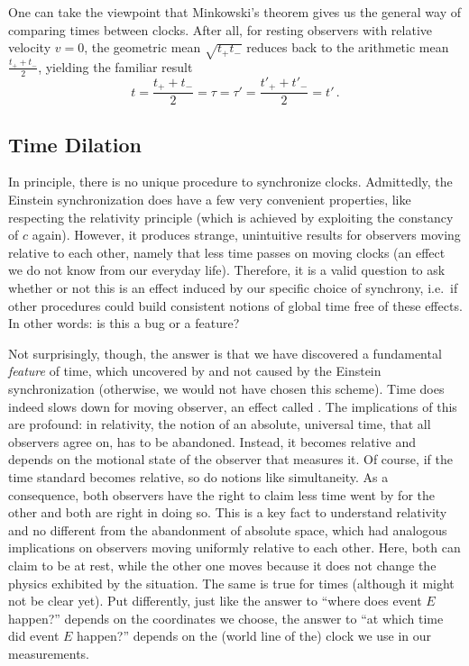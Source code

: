 


One can take the viewpoint that Minkowski's theorem gives us the general way of comparing times between clocks. After all, for resting observers with relative velocity $v = 0$, the geometric mean $\sqrt{t_+ t_-}$ reduces back to the arithmetic mean $\frac{t_+ + t_-}{2}$, yielding the familiar result
\begin{equation}
	t = \frac{t_+ + t_-}{2} = \tau = \tau' = \frac{t'_+ + t'_-}{2} = t' \, .
\end{equation}



		\subsection{Time Dilation}
In principle, there is no unique procedure to synchronize clocks. Admittedly, the Einstein synchronization does have a few very convenient properties, like respecting the relativity principle (which is achieved by exploiting the constancy of $c$ again). However, it produces strange, unintuitive results for observers moving relative to each other, namely that less time passes on moving clocks (an effect we do not know from our everyday life). Therefore, it is a valid question to ask whether or not this is an effect induced by our specific choice of synchrony, i.e.~if other procedures could build consistent notions of global time free of these effects. In other words: is this a bug or a feature?


Not surprisingly, though, the answer is that we have discovered a fundamental \emph{feature} of time, which uncovered by and not caused by the Einstein synchronization (otherwise, we would not have chosen this scheme). Time does indeed slows down for moving observer, an effect called . The implications of this are profound: in relativity, the notion of an absolute, universal time, that all observers agree on, has to be abandoned. Instead, it becomes relative and depends on the motional state of the observer that measures it. Of course, if the time standard becomes relative, so do notions like simultaneity. As a consequence, both observers have the right to claim less time went by for the other and both are right in doing so. This is a key fact to understand relativity and no different from the abandonment of absolute space, which had analogous implications on observers moving uniformly relative to each other. Here, both can claim to be at rest, while the other one moves because it does not change the physics exhibited by the situation. The same is true for times (although it might not be clear yet). Put differently, just like the answer to \enquote{where does event $E$ happen?} depends on the coordinates we choose, the answer to \enquote{at which time did event $E$ happen?} depends on the (world line of the) clock we use in our measurements.


